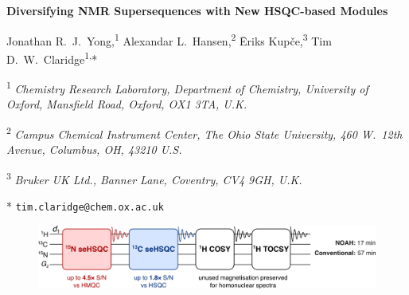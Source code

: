 \documentclass[11pt]{article}
\newcommand*{\hsqctitle}{Diversifying NMR Supersequences with New HSQC-based Modules}
\newcommand*{\carbon}{\ce{^{13}C}}
\newcommand*{\nitrogen}{\ce{^{15}N}}
\begin{document}
\begin{refsection}

\begin{center}
    \Large \textbf{\hsqctitle{}}

    \vspace{0.2cm}

    \large Jonathan R.\ J.\ Yong,\textsuperscript{1} Alexandar L.\ Hansen,\textsuperscript{2} {\=E}riks Kup{\v{c}}e,\textsuperscript{3} Tim D.\ W.\ Claridge\textsuperscript{1,}*

    \vspace{0.2cm}

    \normalsize

    \textsuperscript{1} \textit{Chemistry Research Laboratory, Department of Chemistry, University of Oxford, Mansfield Road, Oxford, OX1 3TA, U.K.}

    \textsuperscript{2} \textit{Campus Chemical Instrument Center, The Ohio State University, 460 W.\ 12th Avenue, Columbus, OH, 43210 U.S.}

    \textsuperscript{3} \textit{Bruker UK Ltd., Banner Lane, Coventry, CV4 9GH, U.K.}

    * \texttt{tim.claridge@chem.ox.ac.uk}
\end{center}
\vspace{0.5cm}
\begin{figure}
    \centering
    \includegraphics{toc_graphic.png}
    \label{toc_graphic}
\end{figure}
\begin{abstract}
    The sensitivity-enhanced HSQC, as well as HSQC-TOCSY, experiments have been modified for incorporation into NOAH (\textbf{N}MR by \textbf{O}rdered \textbf{A}cquisition using \textbf{H} detection) supersequences, adding diversity for \carbon{} and \nitrogen{} modules.
    Importantly, these heteronuclear modules have been specifically tailored to preserve the magnetisation required for subsequent acquisition of other heteronuclear or homonuclear modules in a supersequence.
    In addition, we present protocols for optimally combining HSQC and HSQC-TOCSY elements within the same supersequences, yielding high-quality 2D spectra suitable for structure characterisation but with greatly reduced experiment durations.
    We further demonstrate that these time savings can translate to increased detection sensitivity per unit time.
\end{abstract}


\end{refsection}
\end{document}
